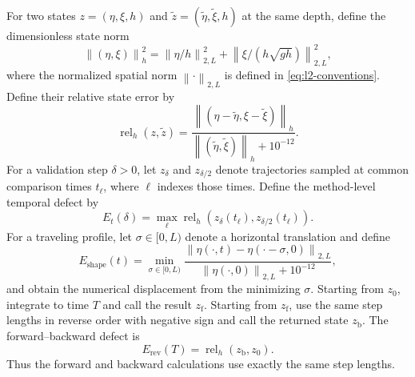 \documentclass[11pt]{article}
\newcommand{\norm}[1]{\left\lVert #1\right\rVert}
\begin{document}
For two states $z=(\eta,\xi,h)$ and
$\widetilde z=(\widetilde\eta,\widetilde\xi,h)$ at the same depth, define
the dimensionless state norm
\begin{equation}
  \norm{(\eta,\xi)}_h^2
  =
  \norm{\eta/h}_{2,L}^2
  +
  \norm{\xi/(h\sqrt{gh})}_{2,L}^2,
  \label{eq:dimensionless-state-norm}
\end{equation}
where the normalized spatial norm $\norm{\cdot}_{2,L}$ is defined in
\eqref{eq:l2-conventions}.  Define
their relative state error by
\begin{equation}
  \operatorname{rel}_h(z,\widetilde z)
  =\frac{\norm{(\eta-\widetilde\eta,\xi-\widetilde\xi)}_h}
         {\norm{(\widetilde\eta,\widetilde\xi)}_h+10^{-12}}.
  \label{eq:relative-state-distance}
\end{equation}
For a validation step $\delta>0$, let $z_{\delta}$ and $z_{\delta/2}$ denote
trajectories sampled at common comparison times $t_\ell$, where $\ell$
indexes those times.  Define the method-level temporal defect by
\begin{equation}
  E_t(\delta)
  =\max_\ell \operatorname{rel}_h\!\left(
    z_{\delta}(t_\ell),z_{\delta/2}(t_\ell)\right).
  \label{eq:temporal-refinement-defect}
\end{equation}
For a traveling profile, let $\sigma\in[0,L)$ denote a horizontal translation
and define
\begin{equation}
  E_{\mathrm{shape}}(t)
  =\min_{\sigma\in[0,L)}
   \frac{\norm{\eta(\cdot,t)-\eta(\cdot-\sigma,0)}_{2,L}}
        {\norm{\eta(\cdot,0)}_{2,L}+10^{-12}},
  \label{eq:translation-aligned-shape-error}
\end{equation}
and obtain the numerical displacement from the minimizing $\sigma$.
Starting from $z_0$, integrate to time $T$ and call the result
$z_{\mathrm f}$.  Starting from $z_{\mathrm f}$, use the same step
lengths in reverse order with negative sign and call the returned state
$z_{\mathrm b}$.  The forward--backward defect is
\begin{equation}
  E_{\mathrm{rev}}(T)
  =\operatorname{rel}_h(z_{\mathrm b},z_0).
  \label{eq:reversibility-defect}
\end{equation}
Thus the forward and backward calculations use exactly the same step lengths.
\end{document}
